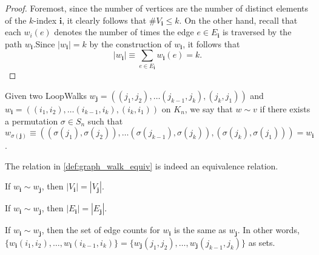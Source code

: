 \begin{proof}
  Foremost, since the number of vertices
  are the number of distinct elements of the $k$-index $\mathbf{i}$, it clearly follows that $\#V_\mathbf{i} \leq k$.
  On the other hand, recall that each $w_i(e)$ denotes the number of times the edge $e \in E_\mathbf{i}$
  is traversed by the path $w_\mathbf{i}$.Since $|w_\mathbf{i}| = k$ by the construction of $w_\mathbf{i}$, it follows that
  \[
  |w_\mathbf{i}| \equiv \sum_{e \in E_\mathbf{i}} w_\mathbf{i}(e) = k.
  \]
\end{proof}


\begin{definition}
  \label{def:graph_walk_equiv}
  Given two LoopWalks $w_{\mathbf{j}} = ((j_1, j_2), \dots (j_{k-1}, j_k), (j_k, j_1))$ and
  $w_{\mathbf{i}}=((i_1, i_2), \dots (i_{k-1}, i_k), (i_k, i_1))$
   on $K_n$, we say that $w \sim v$ if there exists a permutation $\sigma \in S_n$ such that
   $w_{\sigma(\mathbf{j})} \equiv ((\sigma(j_1), \sigma(j_2)), \dots (\sigma(j_{k-1}), \sigma(j_k)), (\sigma(j_{k}), \sigma(j_1)))
   = w_{\mathbf{i}}$.
\end{definition}


\begin{lemma}
  \label{lem:graph_walk_equiv}
  The relation in \ref{def:graph_walk_equiv} is indeed an equivalence relation.
\end{lemma}


\begin{lemma}
  \label{lem:walk_vertex_card_equiv}
  If $w_{\mathbf{i}} \sim w_{\mathbf{j}}$, then $|V_{\mathbf{i}}| = |V_{\mathbf{j}}|$.
\end{lemma}


\begin{lemma}
  \label{lem:walk_edge_card_equiv}
  If $w_{\mathbf{i}} \sim w_{\mathbf{j}}$, then $|E_{\mathbf{i}}| = |E_{\mathbf{j}}|$.
\end{lemma}


\begin{lemma}
  \label{lem:walk_edge_count_equiv}
  If $w_{\mathbf{i}} \sim w_{\mathbf{j}}$, then the set of edge counts for $w_{\mathbf{i}}$ is the
  same as $w_{\mathbf{j}}$. In other words,
  $\{w_{\mathbf{i}}(i_1, i_2) , \dots, w_{\mathbf{i}}(i_{k-1}, i_k)\} =
  \{w_{\mathbf{j}}(j_1, j_2) , \dots, w_{\mathbf{j}}(j_{k-1}, j_k)\}$ as sets.
\end{lemma}


